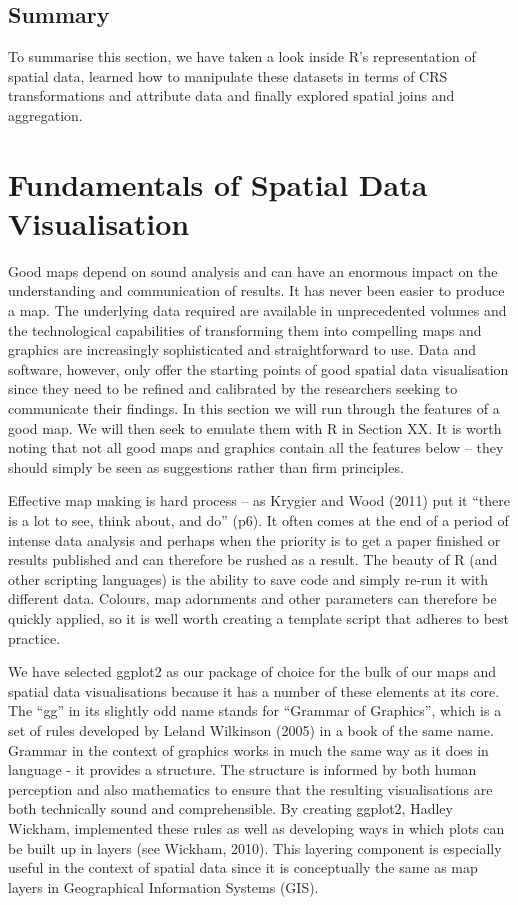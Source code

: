 \documentclass[]{article}
\begin{document}
\subsection{Summary}

To summarise this section, we have taken a look inside R's
representation of spatial data, learned how to manipulate these datasets
in terms of CRS transformations and attribute data and finally explored
spatial joins and aggregation.

\section{Fundamentals of Spatial Data Visualisation}

Good maps depend on sound analysis and can have an enormous impact on
the understanding and communication of results. It has never been easier
to produce a map. The underlying data required are available in
unprecedented volumes and the technological capabilities of transforming
them into compelling maps and graphics are increasingly sophisticated
and straightforward to use. Data and software, however, only offer the
starting points of good spatial data visualisation since they need to be
refined and calibrated by the researchers seeking to communicate their
findings. In this section we will run through the features of a good
map. We will then seek to emulate them with R in Section XX. It is worth
noting that not all good maps and graphics contain all the features
below -- they should simply be seen as suggestions rather than firm
principles.

Effective map making is hard process -- as Krygier and Wood (2011) put
it ``there is a lot to see, think about, and do'' (p6). It often comes
at the end of a period of intense data analysis and perhaps when the
priority is to get a paper finished or results published and can
therefore be rushed as a result. The beauty of R (and other scripting
languages) is the ability to save code and simply re-run it with
different data. Colours, map adornments and other parameters can
therefore be quickly applied, so it is well worth creating a template
script that adheres to best practice.

We have selected ggplot2 as our package of choice for the bulk of our
maps and spatial data visualisations because it has a number of these
elements at its core. The ``gg'' in its slightly odd name stands for
``Grammar of Graphics'', which is a set of rules developed by Leland
Wilkinson (2005) in a book of the same name. Grammar in the context of
graphics works in much the same way as it does in language - it provides
a structure. The structure is informed by both human perception and also
mathematics to ensure that the resulting visualisations are both
technically sound and comprehensible. By creating ggplot2, Hadley
Wickham, implemented these rules as well as developing ways in which
plots can be built up in layers (see Wickham, 2010). This layering
component is especially useful in the context of spatial data since it
is conceptually the same as map layers in Geographical Information
Systems (GIS).
\end{document}
